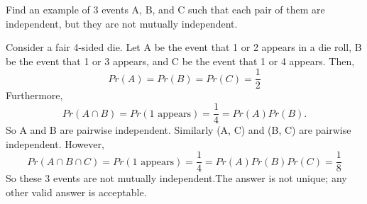 \question Find an example of 3 events A, B, and C such that each pair 
of them are independent, but they are not mutually independent.
\begin{solution}[2 cm]
Consider a fair 4-sided die. Let A be the event that 1 or 2 appears in 
a die roll, B be the event that 1 or 3 appears, and C be the event 
that 1 or 4 appears. Then, 
\[Pr(A) = Pr(B) = Pr(C) = \frac{1}{2}\] 
Furthermore, 
\[Pr(A \cap B) = Pr({1\text{ appears}}) = \frac{1}{4} = Pr(A) Pr(B).\]
So A and B are pairwise independent. Similarly (A, C) and (B, C) are 
pairwise independent. However, 
\[Pr(A \cap B \cap C) = Pr({1\text{ appears}}) = \frac{1}{4} = Pr(A) 
Pr(B) Pr(C) = \frac{1}{8}\]
So these 3 events are not mutually independent.The answer is not unique; 
any other valid answer is acceptable.
 \end{solution}
